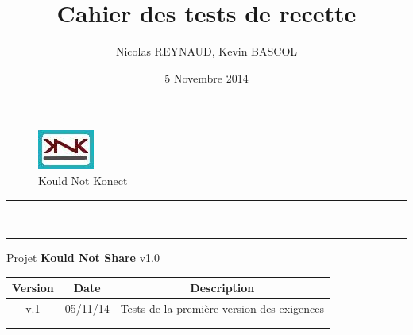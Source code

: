 \documentclass[10pt,a4paper,landscape]{report}
\author{Nicolas REYNAUD, Kevin BASCOL}
\title{Cahier des tests de recette}
\date{5 Novembre 2014}
\begin{document}
\makeatletter
	\begin{titlepage}
	
	\begin{figure}
		\begin{minipage}[c]{.46\linewidth}
		\end{minipage} \hfill
		\begin{minipage}[c]{.20\linewidth}
			\begin{center}
				\includegraphics{../Logo/logoKNK.jpg}\\
				{\large Kould Not Konect}
			\end{center}
		\end{minipage}
	\vspace{1cm}
	\end{figure}
	
	\centering
		{
		\hrule height 2pt
		\vspace{0.7cm}
		\Huge \textbf{\@title}}\\
		\vspace{0.7cm}
		\hrule height 2pt
		\vspace{1.5cm}
		{\LARGE  Projet \textbf{Kould Not Share} v1.0}
		
		\vfill
		
		\begin{tabular}{|c|c|c|}
			\hline
			Version & Date & Description\\
			\hline
			v.1 & 05/11/14 & Tests de la première version des exigences\\
			\hline
			 & & \\
			\hline
			 & & \\
			\hline
		\end{tabular}\\
		\vspace{1cm}
		\@author\\
		\end{titlepage}
\makeatother
\setcounter{secnumdepth}{5}
\setcounter{tocdepth}{5}
\renewcommand{\contentsname}{Sommaire}
\begingroup\makeatletter
\def\@makeschapterhead#1{%
  {\parindent \z@ \raggedright
    \normalfont
    \interlinepenalty\@M
    \Huge \bfseries  #1\par\nobreak
    \vskip 20pt%
  }}\makeatother
\tableofcontents
\endgroup
\thispagestyle{empty}
\setcounter{page}{0}
\newpage
\end{document}

